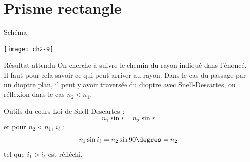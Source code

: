 \documentclass[../main/main.tex]{subfiles}
\begin{document}
\newpage

\setcounter{section}{8}
\section{Prisme rectangle}
\begin{tcbraster}[raster columns=3, raster equal height=rows]
    \begin{NCdefi}[raster multicolumn=2]{Schéma}
        \begin{center}
            \texttt{[image: ch2-9]}
        \end{center}
    \end{NCdefi}
    \begin{tcolorbox}[blankest, raster multicolumn=1, space to=\myspace]
        \begin{tcbraster}[raster columns=1]
            \begin{NCprop}[]{Résultat attendu}
                On cherche à suivre le chemin du rayon indiqué dans l'énoncé. Il
                faut pour cela savoir ce qui peut arriver au rayon. Dans le cas
                du passage par un dioptre plan, il peut y avoir traversée du
                dioptre avec Snell-Descartes, ou réflexion dans le cas $n_2 <
                n_1$.
            \end{NCprop}
            \begin{NCdemo}{Outils du cours}
                Loi de Snell-Descartes :
                \[ n_1\sin i = n_2\sin r\]
                et pour $n_2 < n_1$, $i_\ell$ :
                \[ n_1\sin i_\ell = n_2\sin 90\degres = n_2\]
                tel que $i_1 > i_\ell$ est réfléchi.
            \end{NCdemo}
        \end{tcbraster}
    \end{tcolorbox}
\end{tcbraster}
\end{document}
